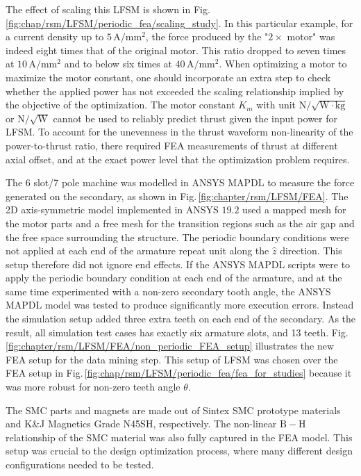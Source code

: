     
            The effect of scaling this \acs{LFSM} is shown in Fig.\,\ref{fig:chap/rsm/LFSM/periodic_fea/scaling_study}. In this particular example, for a current density up to $5\,\mathrm{A/ mm^2}$, the force produced by the "$2\times$ motor" was indeed eight times that of the original motor. This ratio dropped to seven times at $10\,\mathrm{A/ mm^2}$ and to below six times at $40\,\mathrm{A/ mm^2}$. When optimizing a motor to maximize the motor constant, one should incorporate an extra step to check whether the applied power has not exceeded the scaling relationship implied by the objective of the optimization. The motor constant $K_m$ with unit $\mathrm{N/\sqrt{W\cdot kg}}$ or $\mathrm{N/\sqrt{W}}$ cannot be used to reliably predict thrust given the input power for \acs{LFSM}. To account for the unevenness in the thrust waveform non-linearity of the power-to-thrust ratio, there required \acs{FEA} measurements of thrust at different axial offset, and at the exact power level that the optimization problem requires.
            

            The 6 slot/7 pole machine was modelled in ANSYS MAPDL to measure the force generated on the secondary, as shown in Fig.\,\ref{fig:chapter/rsm/LFSM/FEA}. The 2D axis-symmetric model implemented in ANSYS  $19.2$ used a mapped mesh for the motor parts and a free mesh for the transition regions such as the air gap and the free space surrounding the structure. The periodic boundary conditions were not applied at each end of the armature repeat unit along the $\hat{z}$ direction. This setup therefore did not ignore end effects. If the ANSYS MAPDL scripts were to apply the periodic boundary condition at each end of the armature, and at the same time experimented with a non-zero secondary tooth angle, the ANSYS MAPDL model was tested to produce significantly more execution errors. Instead the simulation setup added three extra teeth on each end of the secondary. As the result, all simulation test cases has exactly six armature slots, and 13 teeth. Fig.\,\ref{fig:chapter/rsm/LFSM/FEA/non_periodic_FEA_setup} illustrates the new \acs{FEA} setup for the data mining step. This setup of \acs{LFSM} was chosen over the \acs{FEA} setup in Fig.\,\ref{fig:chap/rsm/LFSM/periodic_fea/fea_for_studies} because it was more robust for non-zero teeth angle $\theta$.
            

            The \acs{SMC} parts and magnets are made out of Sintex \acs{SMC} prototype materials and K$\&$J Magnetics Grade N45SH, respectively. The non-linear $\mathrm{B-H}$ relationship of the \acs{SMC} material was also fully captured in the FEA model. This setup was crucial to the design optimization process, where many different design configurations needed to be tested.
            
